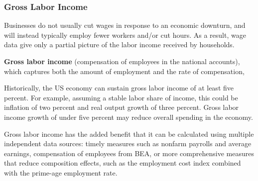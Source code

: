 \subsubsection*{Gross Labor Income}
\begin{minipage}{0.76\textwidth}   
\small Businesses do not usually cut wages in response to an economic downturn, and will instead typically employ fewer workers and/or cut hours. As a result, wage data give only a partial picture of the labor income received by households.

\textbf{Gross labor income} (compensation of employees in the national accounts), which captures both the amount of employment and the rate of compensation,  
\vspace{1mm}

\vspace{2.8cm}

\hspace{5mm} 

\vspace{2mm}

\small Historically, the US economy can sustain gross labor income of at least five percent. For example, assuming a stable labor share of income, this could be inflation of two percent and real output growth of three percent. Gross labor income growth of under five percent may reduce overall spending in the economy. 

Gross labor income has the added benefit that it can be calculated using multiple independent data sources: timely measures such as nonfarm payrolls and average earnings, compensation of employees from BEA, or more comprehensive measures that reduce composition effects, such as the employment cost index combined with the prime-age employment rate. 

\end{minipage}

